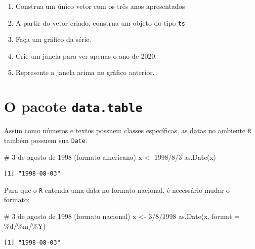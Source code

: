 \documentclass[
  letterpaper,
  DIV=11,
  numbers=noendperiod]{scrreprt}
\newenvironment{Shaded}{\begin{snugshade}}{\end{snugshade}}
\newcommand{\AttributeTok}[1]{\textcolor[rgb]{0.40,0.45,0.13}{#1}}
\newcommand{\CommentTok}[1]{\textcolor[rgb]{0.37,0.37,0.37}{#1}}
\newcommand{\FunctionTok}[1]{\textcolor[rgb]{0.28,0.35,0.67}{#1}}
\newcommand{\NormalTok}[1]{\textcolor[rgb]{0.00,0.23,0.31}{#1}}
\newcommand{\OtherTok}[1]{\textcolor[rgb]{0.00,0.23,0.31}{#1}}
\newcommand{\StringTok}[1]{\textcolor[rgb]{0.13,0.47,0.30}{#1}}
\begin{document}
\begin{enumerate}
\def\labelenumi{\arabic{enumi}.}
\item
  Construa um único vetor com os três anos apresentados
\item
  A partir do vetor criado, construa um objeto do tipo \texttt{ts}
\item
  Faça um gráfico da série.
\item
  Crie um janela para ver apenas o ano de 2020.
\item
  Represente a janela acima no gráfico anterior.
\end{enumerate}

\hypertarget{o-pacote-data.table}{%
\section{\texorpdfstring{O pacote
\texttt{data.table}}{O pacote data.table}}\label{o-pacote-data.table}}

Assim como números e textos possuem classes específicas, as datas no
ambiente \texttt{R} também possuem sua \texttt{Date}.

\begin{Shaded}
\begin{Highlighting}[]
\CommentTok{\# 3 de agosto de 1998 (formato americano)}
\NormalTok{x }\OtherTok{\textless{}{-}} \StringTok{\textquotesingle{}1998/8/3\textquotesingle{}}
\FunctionTok{as.Date}\NormalTok{(x)}
\end{Highlighting}
\end{Shaded}

\begin{verbatim}
[1] "1998-08-03"
\end{verbatim}

Para que o \texttt{R} entenda uma data no formato nacional, é necessário
mudar o formato:

\begin{Shaded}
\begin{Highlighting}[]
\CommentTok{\# 3 de agosto de 1998 (formato nacional)}
\NormalTok{x }\OtherTok{\textless{}{-}} \StringTok{\textquotesingle{}3/8/1998\textquotesingle{}}
\FunctionTok{as.Date}\NormalTok{(x, }\AttributeTok{format =} \StringTok{\textquotesingle{}\%d/\%m/\%Y\textquotesingle{}}\NormalTok{)}
\end{Highlighting}
\end{Shaded}

\begin{verbatim}
[1] "1998-08-03"
\end{verbatim}
\end{document}
